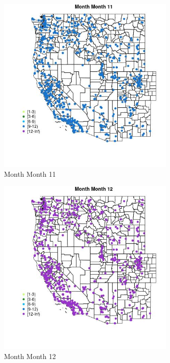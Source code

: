 \begin{figure} 
\centering  
\includegraphics[width=0.77\textwidth]{Code_Outputs/Report_ML_input_PM25_Step4_part_e_de_duplicated_aveswNAs_MapObsMo11Month.jpg} 
\caption{\label{fig:Report_ML_input_PM25_Step4_part_e_de_duplicated_aveswNAsMapObsMo11Month}Month Month 11} 
\end{figure} 
 

\begin{figure} 
\centering  
\includegraphics[width=0.77\textwidth]{Code_Outputs/Report_ML_input_PM25_Step4_part_e_de_duplicated_aveswNAs_MapObsMo12Month.jpg} 
\caption{\label{fig:Report_ML_input_PM25_Step4_part_e_de_duplicated_aveswNAsMapObsMo12Month}Month Month 12} 
\end{figure} 
 

